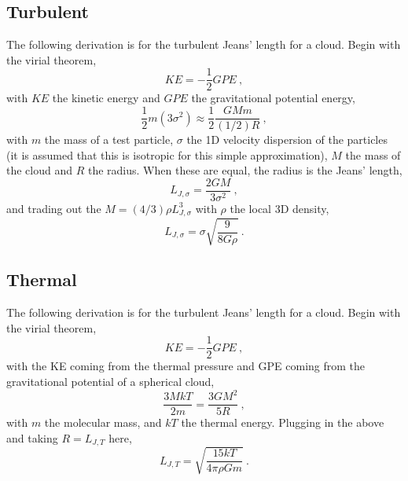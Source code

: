 \subsection{Turbulent}

The following derivation is for the turbulent Jeans' length for a cloud.
Begin with the virial theorem,
$$
    KE = - \frac{1}{2} GPE~,
$$
with $KE$ the kinetic energy and $GPE$ the gravitational potential energy,
$$
\frac{1}{2} m (3 \sigma^2) \approx \frac{1}{2} \frac{G M m}{(1/2)R}~,
$$
with $m$ the mass of a test particle, $\sigma$ the 1D velocity dispersion of the particles (it is assumed that this is isotropic for this simple approximation), $M$ the mass of the cloud and $R$ the radius.
When these are equal, the radius is the Jeans' length,
$$
L_{J, \sigma} = \frac{2 G M}{3 \sigma^2}~,
$$
and trading out the $M = (4/3) \rho L_{J, \sigma}^3$ with $\rho$ the local 3D density,
$$
L_{J, \sigma} = \sigma \sqrt{\frac{9}{8 G \rho}}~.
$$

\subsection{Thermal}

The following derivation is for the turbulent Jeans' length for a cloud.
Begin with the virial theorem,
$$
    KE = - \frac{1}{2} GPE~,
$$
with the KE coming from the thermal pressure and GPE coming from the gravitational potential of a spherical cloud,
$$
    \frac{3 M kT}{2 m} = \frac{3 G M^2}{5R}~,
$$
with $m$ the molecular mass, and $kT$ the thermal energy.
Plugging in the above and taking $R = L_{J, T}$ here,
$$
    L_{J, T} = \sqrt{\frac{15 kT}{4\pi\rho G m}}~.
$$
